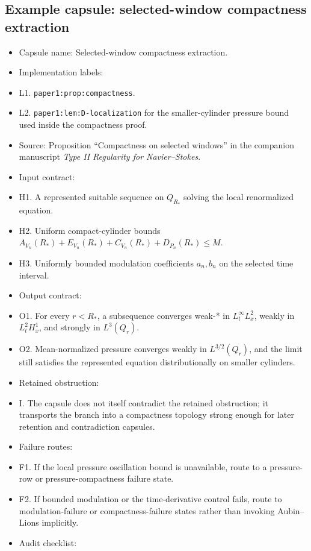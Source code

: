 \documentclass[11pt]{article}
\theoremstyle{plain}
\theoremstyle{definition}
\theoremstyle{remark}
\begin{document}
\subsection{Example capsule: selected-window compactness extraction}
\begin{itemize}
  \item Capsule name: Selected-window compactness extraction.
  \item Implementation labels:
  \item L1. \texttt{paper1:prop:compactness}.
  \item L2. \texttt{paper1:lem:D-localization} for the smaller-cylinder pressure bound used inside the compactness proof.
  \item Source: Proposition ``Compactness on selected windows'' in the companion manuscript \emph{Type II Regularity for Navier--Stokes}.
  \item Input contract:
  \item H1. A represented suitable sequence on $Q_{R_*}$ solving the local renormalized equation.
  \item H2. Uniform compact-cylinder bounds $A_{V_n}(R_*)+E_{V_n}(R_*)+C_{V_n}(R_*)+D_{P_n}(R_*)\le M$.
  \item H3. Uniformly bounded modulation coefficients $a_n,b_n$ on the selected time interval.
  \item Output contract:
  \item O1. For every $r<R_*$, a subsequence converges weak-* in $L^\infty_tL^2_x$, weakly in $L^2_tH^1_x$, and strongly in $L^3(Q_r)$.
  \item O2. Mean-normalized pressure converges weakly in $L^{3/2}(Q_r)$, and the limit still satisfies the represented equation distributionally on smaller cylinders.
  \item Retained obstruction:
  \item I. The capsule does not itself contradict the retained obstruction; it transports the branch into a compactness topology strong enough for later retention and contradiction capsules.
  \item Failure routes:
  \item F1. If the local pressure oscillation bound is unavailable, route to a pressure-row or pressure-compactness failure state.
  \item F2. If bounded modulation or the time-derivative control fails, route to modulation-failure or compactness-failure states rather than invoking Aubin--Lions implicitly.
  \item Audit checklist:

\end{itemize}
\end{document}
